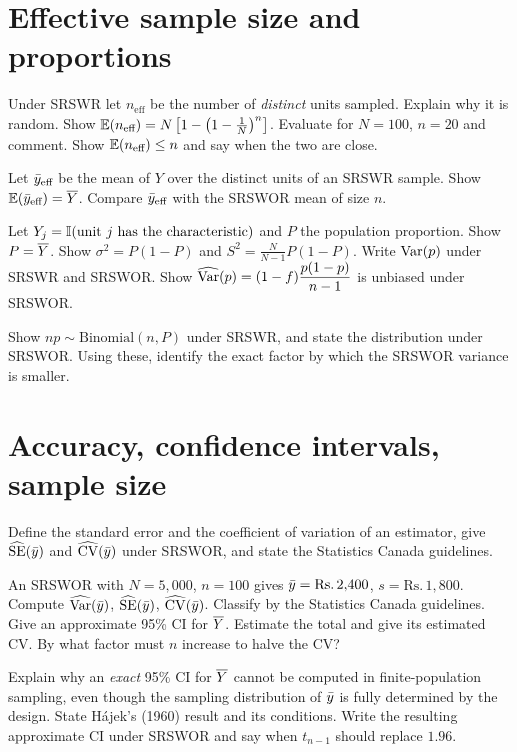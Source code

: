 \section{Effective sample size and proportions}

Under SRSWR let $n_{\text{eff}}$ be the number of \emph{distinct} units sampled.
 Explain why it is random.
 Show $\mathbb{E}(n_{\text{eff}})=N\left[1-\left(1-\frac1N\right)^n\right]$.
 Evaluate for $N=100$, $n=20$ and comment.
 Show $\mathbb{E}(n_{\text{eff}})\le n$ and say when the two are close.

Let $\bar{y}_{\text{eff}}$ be the mean of $Y$ over the distinct units of an SRSWR sample. Show
$\mathbb{E}(\bar{y}_{\text{eff}})=\overline{Y}$.  Compare $\bar{y}_{\text{eff}}$ with the SRSWOR mean of size $n$.

Let $Y_j=\mathbb{I}(\text{unit }j\text{ has the characteristic})$ and $P$ the population proportion.
 Show $P=\overline{Y}$.
 Show $\sigma^2=P(1-P)$ and $S^2=\frac{N}{N-1}P(1-P)$.
 Write $\operatorname{Var}(p)$ under SRSWR and SRSWOR.
 Show $\widehat{\operatorname{Var}}(p)=(1-f)\dfrac{p(1-p)}{n-1}$ is unbiased under SRSWOR.

 Show $np\sim\text{Binomial}(n,P)$ under SRSWR, and state the distribution under SRSWOR.
 Using these, identify the exact factor by which the SRSWOR variance is smaller.

\section{Accuracy, confidence intervals, sample size}

Define the standard error and the coefficient of variation of an estimator, give
$\widehat{\operatorname{SE}}(\bar{y})$ and $\widehat{\operatorname{CV}}(\bar{y})$ under SRSWOR, and state the Statistics Canada guidelines.

An SRSWOR with $N=5{,}000$, $n=100$ gives $\bar{y}=\text{Rs.}\,2{,}400$, $s=\text{Rs.}\,1{,}800$.
 Compute $\widehat{\operatorname{Var}}(\bar{y})$, $\widehat{\operatorname{SE}}(\bar{y})$, $\widehat{\operatorname{CV}}(\bar{y})$.
 Classify by the Statistics Canada guidelines.
 Give an approximate 95\% CI for $\overline{Y}$.
 Estimate the total and give its estimated CV.
 By what factor must $n$ increase to halve the CV?

 Explain why an \emph{exact} 95\% CI for $\overline{Y}$ cannot be computed in finite-population
sampling, even though the sampling distribution of $\bar{y}$ is fully determined by the design.
 State H\'ajek's (1960) result and its conditions.
 Write the resulting approximate CI under SRSWOR and say when $t_{n-1}$ should replace
$1.96$.

